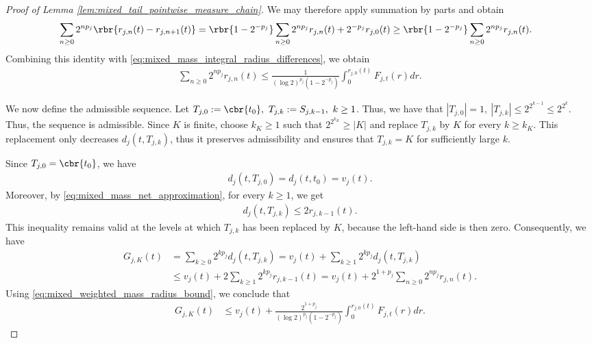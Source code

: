 \documentclass[11pt]{article}
\begin{document}
\begin{proof}[Proof of Lemma
\ref{lem:mixed_tail_pointwise_measure_chain}]
We may therefore apply summation by parts and obtain
\begin{align*}
&\sum_{n\ge0}
2^{np_j}
\rbr{r_{j,n}(t)-r_{j,n+1}(t)}=
\rbr{1-2^{-p_j}}
\sum_{n\ge0}2^{np_j}r_{j,n}(t)
+
2^{-p_j}r_{j,0}(t)\ge
\rbr{1-2^{-p_j}}
\sum_{n\ge0}2^{np_j}r_{j,n}(t).
\end{align*}
Combining this identity with
\eqref{eq:mixed_mass_integral_radius_differences}, we obtain
\begin{align}
\sum_{n\ge0}2^{np_j}r_{j,n}(t)
\le
\frac{1}{
(\log2)^{p_j}(1-2^{-p_j})
}
\int_0^{r_{j,0}(t)}F_{j,t}(r)dr.
\label{eq:mixed_weighted_mass_radius_bound}
\end{align}

We now define the admissible sequence. Let $T_{j,0}:=\cbr{t_0},
\ 
T_{j,k}:=S_{j,k-1},
\ k\ge1$. Thus, we have that $|T_{j,0}|=1,
\ 
|T_{j,k}|
\le
2^{2^{k-1}}
\le
2^{2^k}$. Thus, the sequence is admissible. Since $K$ is finite, choose
$k_K\ge1$ such that $2^{2^{k_K}}\ge|K|$ and replace $T_{j,k}$ by $K$ for every $k\ge k_K$. This replacement
only decreases $d_j(t,T_{j,k})$, thus it preserves admissibility and ensures
that $T_{j,k}=K$ for sufficiently large $k$.

Since $T_{j,0}=\cbr{t_0}$, we have
\begin{align*}
d_j(t,T_{j,0})
=
d_j(t,t_0)
=
v_j(t).
\end{align*}
Moreover, by \eqref{eq:mixed_mass_net_approximation}, for every
$k\ge1$, we get
\begin{align*}
d_j(t,T_{j,k})
\le
2r_{j,k-1}(t).
\end{align*}
This inequality remains valid at the levels at which $T_{j,k}$ has
been replaced by $K$, because the left-hand side is then zero.
Consequently, we have
\begin{align*}
G_{j,K}(t)
&=
\sum_{k\ge0}
2^{kp_j}d_j(t,T_{j,k})=
v_j(t)
+
\sum_{k\ge1}
2^{kp_j}d_j(t,T_{j,k})\\
&\le
v_j(t)
+
2\sum_{k\ge1}
2^{kp_j}r_{j,k-1}(t)=
v_j(t)
+
2^{1+p_j}
\sum_{n\ge0}
2^{np_j}r_{j,n}(t).
\end{align*}
Using \eqref{eq:mixed_weighted_mass_radius_bound}, we conclude that
\begin{align}
G_{j,K}(t)
&\le
v_j(t)
+
\frac{2^{1+p_j}}{
(\log2)^{p_j}(1-2^{-p_j})
}
\int_0^{r_{j,0}(t)}F_{j,t}(r)dr.
\label{eq:mixed_chain_cost_restricted_integral}
\end{align}


\end{proof}
\end{document}

